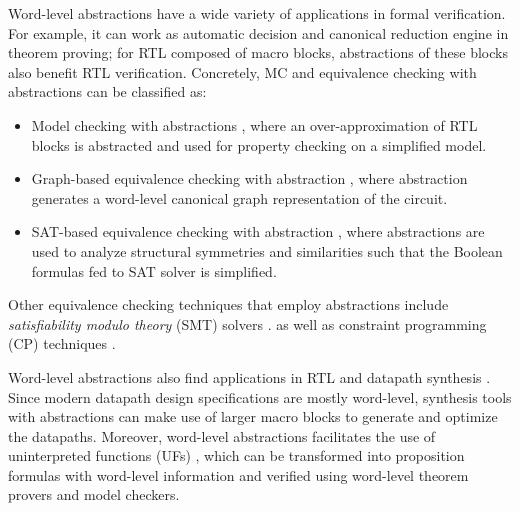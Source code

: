 Word-level abstractions have a wide variety of applications in formal 
verification. For example, it can work as automatic decision and canonical reduction engine in theorem proving;
for RTL composed of macro blocks, abstractions of these blocks also benefit RTL verification.
Concretely, MC and equivalence checking with abstractions can be classified as:
\begin{itemize}  
\item Model checking with abstractions \cite{kroening:model}, 
where an over-approximation of RTL blocks is abstracted and used for property checking on a simplified model.
\item Graph-based equivalence 
checking with abstraction \cite{WLS,arditi:bmd}, where abstraction 
generates a word-level canonical graph representation of the circuit.
\item SAT-based equivalence checking with abstraction \cite{lpsat}, where 
abstractions are used to analyze structural symmetries and similarities such that
the Boolean formulas fed to SAT solver is simplified.
\end{itemize}

Other equivalence checking techniques that employ abstractions 
include {\it satisfiability modulo theory} (SMT) solvers \cite{boolector,bryant:tacas07}.
as well as constraint programming (CP) techniques \cite{ms:research,tew:iccad08}.



Word-level abstractions also find applications in RTL and datapath 
synthesis \cite{demicheli:iccad_98,demicheli:dac_99,demicheli:tcad_03}. 
Since modern datapath design specifications are mostly word-level, synthesis tools with abstractions
can make use of larger macro blocks to generate and optimize the
datapaths. Moreover, 
word-level abstractions facilitates the use of uninterpreted functions (UFs) \cite{UF3}, which 
can be transformed into proposition formulas with word-level information and verified using 
word-level theorem provers and model checkers.

